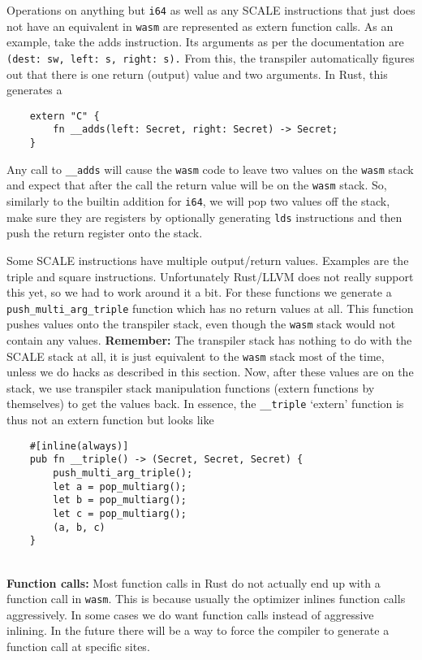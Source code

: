 Operations on anything but \verb|i64| as well as any SCALE instructions that just does not have an equivalent in \verb|wasm|
are represented as extern function calls. As an example, take the adds instruction. Its arguments as per the documentation are
\verb|(dest: sw, left: s, right: s).|
From this, the transpiler automatically figures out that there is one return (output) value and two arguments.
In Rust, this generates a
\begin{lstlisting}
    extern "C" {
        fn __adds(left: Secret, right: Secret) -> Secret;
    }
\end{lstlisting}
Any call to \verb|__adds| will cause the \verb|wasm| code to leave two values on the \verb|wasm| stack and expect that after
the call the return value will be on the \verb|wasm| stack. So, similarly to the builtin addition for \verb|i64|,
we will pop two values off the stack, make sure they are registers by optionally generating
\verb|lds| instructions and then push the return register onto the stack.

Some SCALE instructions have multiple output/return values. Examples are the triple and square instructions.
Unfortunately Rust/LLVM does not really support this yet, so we had to work around it a bit.
For these functions we generate a \verb|push_multi_arg_triple| function which has no return values at all.
This function pushes values onto the transpiler stack, even though the \verb|wasm| stack would not contain any values.
     {\bf Remember:} The transpiler stack has nothing to do with the SCALE stack at all,
it is just equivalent to the \verb|wasm| stack most of the time, unless we do hacks as described in this section.
Now, after these values are on the stack, we use transpiler stack manipulation functions (extern functions by themselves)
to get the values back. In essence, the \verb|__triple| `extern' function is thus not an extern function but looks like
\begin{lstlisting}
    #[inline(always)]
    pub fn __triple() -> (Secret, Secret, Secret) {
        push_multi_arg_triple();
        let a = pop_multiarg();
        let b = pop_multiarg();
        let c = pop_multiarg();
        (a, b, c)
    }
\end{lstlisting}

~\\

\noindent
{\bf Function calls:}
Most function calls in Rust do not actually end up with a function call in
\verb|wasm|. This is because usually the optimizer inlines function calls aggressively.
In some cases we do want function calls instead of aggressive inlining.
In the future there will be a way to force the compiler to generate a function call at
specific sites.

